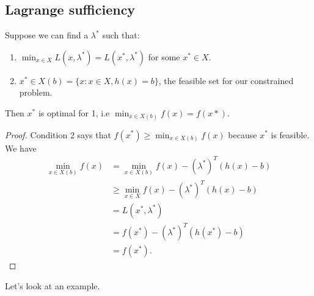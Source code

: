 \documentclass[egregdoesnotlikesansseriftitles,a4paper]{scrartcl}
\begin{document}
\subsection{Lagrange sufficiency}

\begin{theorem}
	 Suppose we can find a $\lambda^*$ such that:
	 \begin{enumerate}
		\item $\min_{x \in X} L (x,\lambda^*)=L (x^*,\lambda^*)$ for some $x^* \in X$.
		\item $x^* \in X(b)=\{x: x \in X, h(x)=b\}$, the feasible set for our constrained problem.
	 \end{enumerate}
	 Then $x^*$ is optimal for 1, i.e $\min_{x \in X(b)}f (x)=f (x*)$.
	 
\end{theorem}
\begin{proof}
	 Condition 2 says that $f (x^*)\geq \min_{x \in X(b)}f (x)$ because $x^*$ is feasible. We have 
	 \begin{equation*}
		  \begin{split}
			\min_{x \in X(b)}f (x)&=\min_{x \in X(b)}f (x)-(\lambda^*)^T (h (x)-b)\\
			&\geq \min_{x \in X}f (x)-(\lambda^*)^T (h (x)-b)\\
			&=L (x^*,\lambda^*)\\
			&=f(x^*)-(\lambda^*)^T (h (x^*)-b)\\
			&=f (x^*).
		  \end{split}
	 \end{equation*}
	 
\end{proof}
Let's look at an example.
\end{document}
